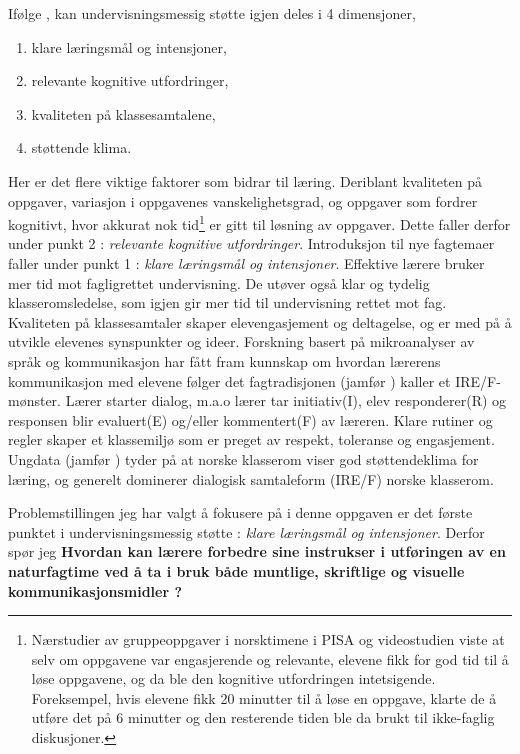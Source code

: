 \documentclass[main.tex]{subfiles}
\begin{document}
Ifølge , kan undervisningsmessig støtte igjen deles i 4 dimensjoner,
\begin{enumerate}
\item klare læringsmål og intensjoner,
\item relevante kognitive utfordringer,
\item kvaliteten på klassesamtalene,
\item støttende klima.
\end{enumerate}
Her er det flere viktige faktorer som bidrar til læring. Deriblant kvaliteten på oppgaver, variasjon i
oppgavenes vanskelighetsgrad, og oppgaver som fordrer kognitivt, hvor akkurat nok tid\footnote{
Nærstudier av gruppeoppgaver i norsktimene i PISA og videostudien  viste at selv om oppgavene
var engasjerende og relevante, elevene fikk for god tid til å løse oppgavene, og da ble den kognitive utfordringen 
intetsigende. Foreksempel, hvis elevene fikk 20 minutter til å løse en oppgave, klarte de å utføre det på 6 
minutter og den resterende tiden ble da brukt til ikke-faglig diskusjoner.} er gitt til løsning av oppgaver. 
Dette faller derfor under punkt 2 : \emph{relevante kognitive utfordringer}. 
Introduksjon til nye fagtemaer faller under punkt 1 : 
\emph{klare læringsmål og intensjoner}. Effektive lærere bruker mer tid mot fagligrettet undervisning. 
De utøver også klar og tydelig klasseromsledelse, som igjen gir mer tid til undervisning rettet mot fag. 
Kvaliteten på klassesamtaler skaper elevengasjement og deltagelse, og er med på å utvikle elevenes synspunkter og ideer. 
Forskning basert på mikroanalyser av språk og kommunikasjon har fått fram kunnskap om hvordan lærerens kommunikasjon
med elevene følger det fagtradisjonen (jamfør ) kaller et IRE/F-mønster. Lærer starter dialog, m.a.o lærer tar 
initiativ(I), elev responderer(R) og responsen blir evaluert(E) og/eller kommentert(F) av læreren.
Klare rutiner og regler skaper et klassemiljø som er preget av respekt, toleranse og engasjement. 
Ungdata (jamfør ) tyder på at norske klasserom viser god støttendeklima for læring, og generelt dominerer 
dialogisk samtaleform (IRE/F) norske klasserom.
\newline

Problemstillingen jeg har valgt å fokusere på i denne oppgaven er det første punktet i undervisningsmessig støtte : 
\emph{klare læringsmål og intensjoner}. Derfor spør jeg 
\newline\newline
\textbf{Hvordan kan lærere forbedre sine instrukser i utføringen av en naturfagtime ved å ta i bruk både muntlige,
skriftlige og visuelle kommunikasjonsmidler ?}
\newline
\end{document}
